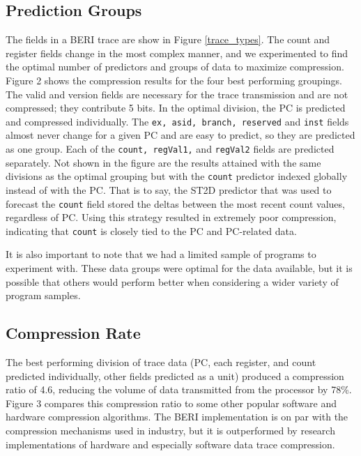 \documentclass[conference]{IEEEtran}
\begin{document}
\subsection{Prediction Groups}
The fields in a BERI trace are show in Figure \ref{trace_types}. The count and register fields change in the most complex manner, and we experimented to find the optimal number of predictors and groups of data to maximize compression. Figure 2 shows the compression results for the four best performing groupings. The valid and version fields are necessary for the trace transmission and are not compressed; they contribute 5 bits. In the optimal division, the PC is predicted and compressed individually. The \texttt{ex, asid, branch, reserved} and \texttt{inst} fields almost never change for a given PC and are easy to predict, so they are predicted as one group. Each of the \texttt{count, regVal1,} and \texttt{regVal2} fields are predicted separately. Not shown in the figure are the results attained with the same divisions as the optimal grouping but with the \texttt{count} predictor indexed globally instead of with the PC. That is to say, the ST2D predictor that was used to forecast the \texttt{count} field stored the deltas between the most recent count values, regardless of PC. Using this strategy resulted in extremely poor compression, indicating that \texttt{count} is closely tied to the PC and PC-related data. 

It is also important to note that we had a limited sample of programs to experiment with. These data groups were optimal for the data available, but it is possible that others would perform better when considering a wider variety of program samples. 

\subsection{Compression Rate}
The best performing division of trace data (PC, each register, and count predicted individually, other fields predicted as a unit) produced a compression ratio of 4.6, reducing the volume of data transmitted from the processor by 78\%. Figure 3 compares this compression ratio to some other popular software and hardware compression algorithms. The BERI implementation is on par with the compression mechanisms used in industry, but it is outperformed by research implementations of hardware and especially software data trace compression. 
\end{document}
